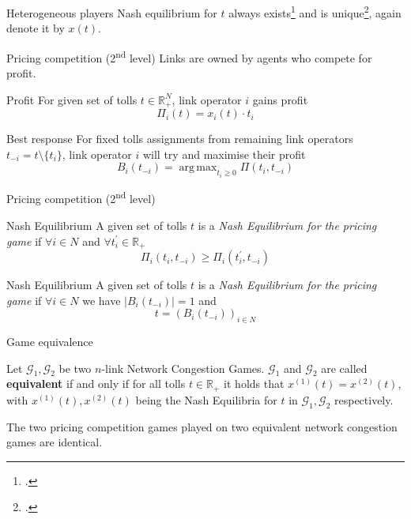 \documentclass{beamer}
\newcommand{\R}{\mathbb{R}}
\newcommand{\Gm}{\mathcal{G}}
\DeclareMathOperator*{\argmax}{arg\,max}
\begin{document}
\begin{frame}{Heterogeneous players}
	Nash equilibrium for $t$ always exists\footcite{1973JSP.....7..295S} and is unique\footcite{MILCHTAICH1996111}, again denote it by $x(t)$.
\end{frame}

\begin{frame}{Pricing competition (2\textsuperscript{nd} level)}
	Links are owned by agents who compete for profit.
	\begin{block}{Profit}
		For given set of tolls $t \in \R_+^N$, link operator $i$ gains profit
		\[\Pi_i(t) = x_i(t) \cdot t_i\]
	\end{block}

	\begin{block}{Best response}
		For fixed tolls assignments from remaining link operators $t_{-i} = t \setminus \{t_i\}$, link operator $i$ will try and maximise their profit
		\[B_i(t_{-i}) = \argmax_{t_i \ge 0} \Pi(t_i, t_{-i})\]
	\end{block}
\end{frame}

\begin{frame}{Pricing competition (2\textsuperscript{nd} level)}
	\begin{block}{Nash Equilibrium}
		A given set of tolls $t$ is a \textit{Nash Equilibrium for the pricing game} if $\forall i \in N$ and $\forall t_i^\prime \in \R_+$
		\[\Pi_i(t_i, t_{-i}) \geq \Pi_i(t_i^\prime, t_{-i})\]
	\end{block}
	\begin{block}{Nash Equilibrium}
		A given set of tolls $t$ is a \textit{Nash Equilibrium for the pricing game} if
		$\forall i \in N$ we have $|B_i(t_{-i})| = 1$ and
		\[t = (B_i(t_{-i}))_{i \in N}\]
	\end{block}
\end{frame}

\begin{frame}{Game equivalence}
	\begin{definition}
		Let $\Gm_1, \Gm_2$ be two $n$-link Network Congestion Games.
		$\Gm_1$ and $\Gm_2$ are called \textbf{equivalent} if and only if for all tolls $t \in \R_+$ it holds that $x^{(1)}(t) = x^{(2)}(t)$, with $x^{(1)}(t), x^{(2)}(t)$ being the Nash Equilibria for $t$ in $\Gm_1, \Gm_2$ respectively.
	\end{definition}
	The two pricing competition games played on two equivalent network congestion games are identical.
\end{frame}
\end{document}
